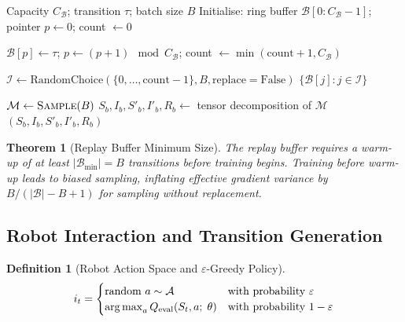 \documentclass[12pt,a4paper]{article}
\theoremstyle{definition}
\newtheorem{definition}{Definition}[section]
\theoremstyle{plain}
\newtheorem{theorem}{Theorem}[section]
\theoremstyle{remark}
\newcommand{\argmax}{\operatornamewithlimits{arg\,max}}
\newcommand{\Qeval}{Q_{\text{eval}}}
\begin{document}
\begin{algorithm}[H]
\caption{Experience Replay Memory Operations}
\label{alg:replay_memory}
\begin{algorithmic}[1]
\Require Capacity $C_\mathcal{B}$; transition $\tau$; batch size $B$
\State Initialise: ring buffer $\mathcal{B}[0:C_\mathcal{B}-1]$; pointer $p \gets 0$; count $\gets 0$

  \State $\mathcal{B}[p] \gets \tau$; $p \gets (p + 1) \mod C_\mathcal{B}$; count $\gets \min(\text{count} + 1, C_\mathcal{B})$
\EndProcedure

  \State $\mathcal{I} \gets \text{RandomChoice}(\{0,\ldots,\text{count}-1\}, B, \text{replace}=\text{False})$
  \State \Return $\{\mathcal{B}[j] : j \in \mathcal{I}\}$
\EndProcedure

  \State $\mathcal{M} \gets \Call{Sample}{B}$
  \State $S_b, I_b, S'_b, I'_b, R_b \gets$ tensor decomposition of $\mathcal{M}$
  \State \Return $(S_b, I_b, S'_b, I'_b, R_b)$
\EndProcedure
\end{algorithmic}
\end{algorithm}

\begin{theorem}[Replay Buffer Minimum Size]
The replay buffer requires a warm-up of at least $|\mathcal{B}_{\min}| = B$ transitions before training begins. Training before warm-up leads to biased sampling, inflating effective gradient variance by $B / (|\mathcal{B}| - B + 1)$ for sampling without replacement.
\end{theorem}

\subsection{Robot Interaction and Transition Generation}

\begin{definition}[Robot Action Space and $\varepsilon$-Greedy Policy]
\[
  i_t = \begin{cases}
    \text{random } a \sim \mathcal{A} & \text{with probability } \varepsilon \\
    \argmax_{a} \Qeval(S_t, a;\; \theta) & \text{with probability } 1 - \varepsilon
  \end{cases}
\]
\end{definition}
\end{document}
